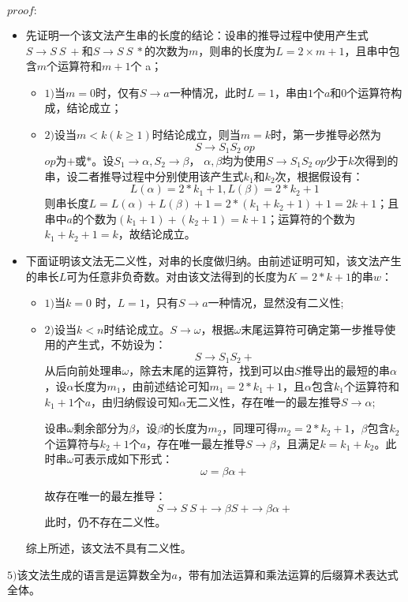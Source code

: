 \documentclass[UTF8,noindent]{ctexart}
\begin{document}
$proof:$
\begin{itemize}
	\item 先证明一个该文法产生串的长度的结论：设串的推导过程中使用产生式$S\rightarrow S\ S\ +$和$S\rightarrow S\ S\ *$的次数为$m$，则串的长度为$L = 2\times m + 1$，且串中包含$m$个运算符和$m+1$个 a；
\begin{itemize}
  \item $1)$当$m=0$时，仅有$S\rightarrow a$一种情况，此时$L=1$，串由$1$个$a$和$0$个运算符构成，结论成立；
\item $2)$设当$m<k(k\ge 1)$时结论成立，则当$m=k$时，第一步推导必然为
\[S\rightarrow S_1S_2\ op\]
$op$为$+$或$*$。设$S_1\rightarrow \alpha, S_2\rightarrow \beta$， $\alpha, \beta$均为使用$S\rightarrow S_1S_2\ op$少于$k$次得到的串，设二者推导过程中分别使用该产生式$k_1$和$k_2$次，根据假设有：
\[L(\alpha) = 2*k_1 + 1, L(\beta) = 2*k_2+1\]
则串长度$L = L(\alpha) + L(\beta) + 1 = 2*(k_1+k_2+ 1) + 1= 2k+1$；且串中$a$的个数为$(k_1+1) + (k_2+1) = k+1$；运算符的个数为$k_1+k_2+1= k$，故结论成立。
\end{itemize}
\item 下面证明该文法无二义性，对串的长度做归纳。由前述证明可知，该文法产生的串长$L$可为任意非负奇数。对由该文法得到的长度为$K = 2*k+1$的串$w$：
  \begin{itemize}
	\item $1)$当$k=0$ 时，$L=1$，只有$S\rightarrow a$一种情况，显然没有二义性;
  \item $2)$设当$k<n$时结论成立。$S\rightarrow \omega$，根据$\omega$末尾运算符可确定第一步推导使用的产生式，不妨设为：
	\[S\rightarrow S_1S_2+\]
  从后向前处理串$\omega$，除去末尾的运算符，找到可以由$S$推导出的最短的串$\alpha$，设$\alpha$长度为$m_1$，由前述结论可知$m_1 = 2*k_1+1$，且$\alpha$包含$k_1$个运算符和$k_1+1$个$a$，由归纳假设可知$\alpha$无二义性，存在唯一的最左推导$S\rightarrow \alpha$;

  设串$\omega$剩余部分为$\beta$，设$\beta$的长度为$m_2$，同理可得$m_2 = 2*k_2+1$，$\beta$包含$k_2$个运算符与$k_2+1$个$a$，存在唯一最左推导$S\rightarrow \beta$，且满足$k = k_1+ k_2$。此时串$\omega$可表示成如下形式：
  \[\omega = \beta\alpha +\]

  故存在唯一的最左推导：
  \[S\rightarrow S\ S\ +\rightarrow \beta S\ + \rightarrow \beta \alpha +\]
  此时，仍不存在二义性。
  \end{itemize}
综上所述，该文法不具有二义性。
\end{itemize}

$5)$该文法生成的语言是运算数全为$a$，带有加法运算和乘法运算的后缀算术表达式全体。
\end{document}
